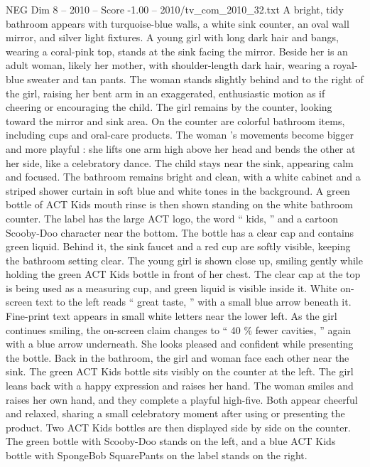 \begin{textsample}{NEG Dim 8 – 2010 – Score -1.00 – 2010/tv\_com\_2010\_32.txt}  \label{ex:f8_neg_079}
A bright, tidy bathroom appears with turquoise-blue walls, a white sink counter, an oval wall mirror, and silver light fixtures.
A young girl with long dark hair and bangs, wearing a coral-pink top, stands at the sink facing the mirror.
Beside her is an adult woman, likely her mother, with shoulder-length dark hair, wearing a royal-blue sweater and tan pants.
The woman stands slightly behind and to the right of the girl, raising her bent arm in an exaggerated, enthusiastic motion as if cheering or encouraging the child.
The girl remains by the counter, looking toward the mirror and sink area.
On the counter are colorful bathroom items, including cups and oral-care products.
The woman ’s movements become bigger and more playful : she lifts one arm high above her head and bends the other at her side, like a celebratory dance.
The child stays near the sink, appearing calm and focused.
The bathroom remains bright and clean, with a white cabinet and a striped shower curtain in soft blue and white tones in the background.
A green bottle of ACT Kids mouth rinse is then shown standing on the white bathroom counter.
The label has the large ACT logo, the word “ kids, ” and a cartoon Scooby-Doo character near the bottom.
The bottle has a clear cap and contains green liquid.
Behind it, the sink faucet and a red cup are softly visible, keeping the bathroom setting clear.
The young girl is shown close up, smiling gently while holding the green ACT Kids bottle in front of her chest.
The clear cap at the top is being used as a measuring cup, and green liquid is visible inside it.
White on-screen text to the left reads “ great taste, ” with a small blue arrow beneath it.
Fine-print text appears in small white letters near the lower left.
As the girl continues smiling, the on-screen claim changes to “ 40 \% fewer cavities, ” again with a blue arrow underneath.
She looks pleased and confident while presenting the bottle.
Back in the bathroom, the girl and woman face each other near the sink.
The green ACT Kids bottle sits visibly on the counter at the left.
The girl leans back with a happy expression and raises her hand.
The woman smiles and raises her own hand, and they complete a playful high-five.
Both appear cheerful and relaxed, sharing a small celebratory moment after using or presenting the product.
Two ACT Kids bottles are then displayed side by side on the counter.
The green bottle with Scooby-Doo stands on the left, and a blue ACT Kids bottle with SpongeBob SquarePants on the label stands on the right.

\end{textsample}
